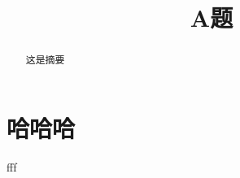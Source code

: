 \documentclass{whutmod}
\title{A题}
\begin{document}
\maketitle
    \begin{abstract}
        这是摘要
    \end{abstract}
    \section{哈哈哈}
        fff
    \en
\end{document}
